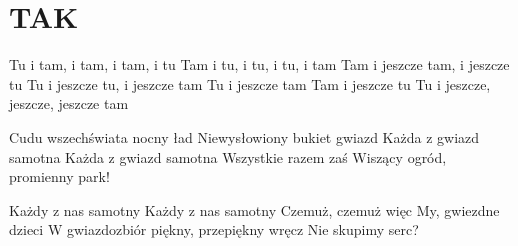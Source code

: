 \documentclass[../../../songbook.tex]{subfiles}
\begin{document}
\TabPositions{8cm} %
\section*{TAK}
{}
\vspace{0.5cm}
Tu i tam, i tam, i tam, i tu 			 \newline
Tam i tu, i tu, i tu, i tam 			 \newline
Tam i jeszcze tam, i jeszcze tu 		 \newline
Tu i jeszcze tu, i jeszcze tam 			 \newline
Tu i jeszcze tam 						 \newline
Tam i jeszcze tu 						 \newline
Tu i jeszcze, jeszcze, jeszcze tam		 \newline

Cudu wszechświata nocny ład 			 \newline
Niewysłowiony bukiet gwiazd 			 \newline
Każda z gwiazd samotna 			         \newline
Każda z gwiazd samotna 					 \newline
Wszystkie razem zaś				         \newline
Wiszący ogród, promienny park! 			 \newline

Każdy z nas samotny  \newline
Każdy z nas samotny  \newline
Czemuż, czemuż więc  \newline
My, gwiezdne dzieci   \newline
W gwiazdozbiór piękny, przepiękny wręcz  \newline
Nie skupimy serc?  \newline
\end{document}
